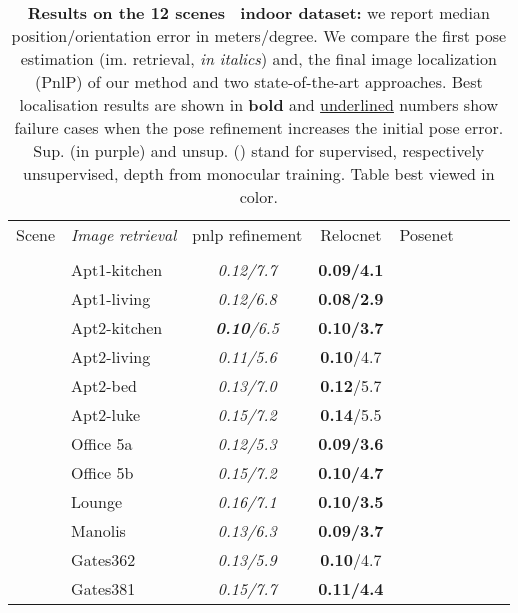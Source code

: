 \begin{table}
\centering

\begin{footnotesize}
\renewcommand{\arraystretch}{1.0}
\begin{tabular}{c l | c c | c c | c c }
					Scene &	\textit{Image retrieval} & \ac{pnlp} refinement & Relocnet & Posenet  \\
&	 &  & \citep{Balntas2018} & \citep{Kendall2017} \\
	\hline
& Apt1-kitchen 	& {\textit{0.12/7.7}} & {\textbf{0.09/4.1}}  \\
& Apt1-living 	& {\textit{0.12/6.8}} &  {\textbf{0.08/2.9}}\\
& Apt2-kitchen 	& {\textit{\textbf{0.10}/6.5}} & {\textbf{0.10/3.7}}   \\
& Apt2-living 	& {\textit{0.11/5.6}} & {\textbf{0.10}/4.7}  \\
& Apt2-bed 		& {\textit{0.13/7.0}} &  {\textbf{0.12}/5.7} \\
& Apt2-luke 	& {\textit{0.15/7.2}} & {\textbf{0.14}/5.5}  \\
& Office 5a	    & {\textit{0.12/5.3}} &  {\textbf{0.09/3.6}}  \\
& Office 5b 	& {\textit{0.15/7.2}} & {\textbf{0.10/4.7}} \\
& Lounge	 	& {\textit{0.16/7.1}} & {\textbf{0.10/3.5}}   \\
& Manolis	 	& {\textit{0.13/6.3}} & {\textbf{0.09/3.7}} \\
& Gates362	 	& {\textit{0.13/5.9}} & {\textbf{0.10}/4.7} \\
& Gates381 		& {\textit{0.15/7.7}} & {\textbf{0.11/4.4}} \\
\end{tabular}
\end{footnotesize}

\caption[Results on 12 scenes dataset]{\label{tab:12_scenes} \textbf{Results on the \textbf{12 scenes}~\citep{Valentin2016} indoor dataset:} we report median position/orientation error in meters/degree. We compare the first pose estimation (im. retrieval, \textit{in italics}) and, the final image localization (PnlP) of our method and two state-of-the-art approaches. Best localisation results are shown in \textbf{bold} and \underline{underlined} numbers show failure cases when the pose refinement increases the initial pose error. Sup. ({in purple}) and unsup. () stand for supervised, respectively unsupervised, depth from monocular training. Table best viewed in color.}


\end{table}